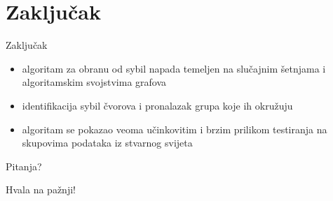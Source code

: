 \documentclass{beamer}
\begin{document}
\section{Zaključak}

\begin{frame}{Zaključak}
  \begin{itemize}
    \item algoritam za obranu od sybil napada temeljen na slučajnim šetnjama i algoritamskim svojstvima grafova
    \item identifikacija sybil čvorova i pronalazak grupa koje ih okružuju
    \item algoritam se pokazao veoma učinkovitim i brzim prilikom testiranja na skupovima podataka iz stvarnog svijeta
  \end{itemize}
\end{frame}

\begin{frame}[standout]
  \Huge{\centerline{Pitanja?}}
\end{frame}

\begin{frame}[standout]
  \Huge{\centerline{Hvala na pažnji!}}
\end{frame}
\end{document}
